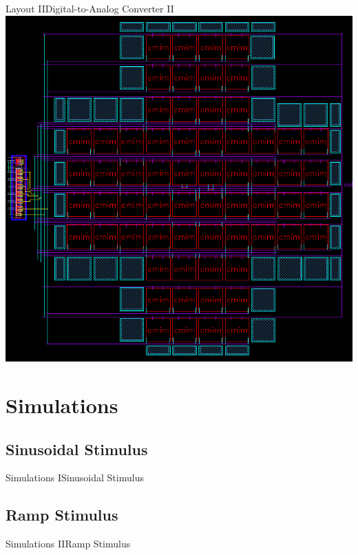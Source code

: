 \documentclass{beamer}
\begin{document}
 \begin{frame}{Layout II}{Digital-to-Analog Converter II}
     \centering
     \includegraphics[height=.8\textheight]{img/layout}
 \end{frame}
 
 \section{Simulations}
 \subsection{Sinusoidal Stimulus}
 \begin{frame}{Simulations I}{Sinusoidal Stimulus}
  \centering
  \resizebox{!}{0.8\textheight}{}
 \end{frame}

 \subsection{Ramp Stimulus}
 \begin{frame}{Simulations II}{Ramp Stimulus}
  \centering
  \resizebox{!}{0.8\textheight}{}
 \end{frame}
\end{document}
